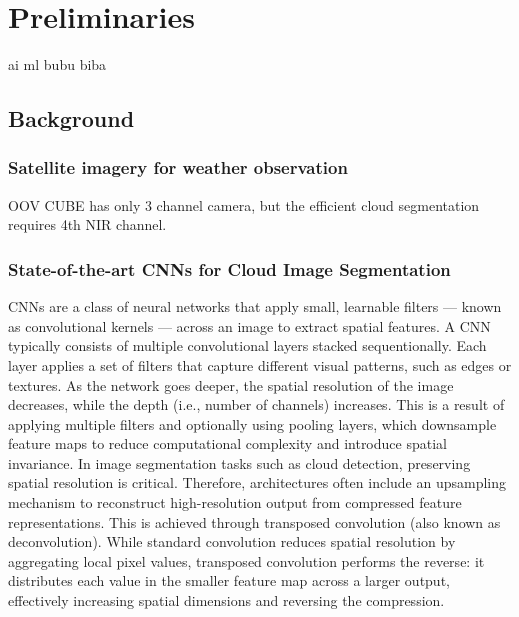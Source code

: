 {

\setlength{\parindent}{0pt}
\setlength{\parskip}{1em}

\section{Preliminaries}
\gls{ai}
\gls{ml}
\gls{bubu}
\gls{biba}
\subsection{Background}
\subsubsection{Satellite imagery for weather observation}
OOV CUBE has only 3 channel camera, but the efficient cloud segmentation requires 4th NIR channel. 
\subsubsection{State-of-the-art CNNs for Cloud Image Segmentation}

CNNs are a class of neural networks that apply small, learnable filters --- known as convolutional kernels --- across an image to extract spatial features. A CNN typically consists of multiple convolutional layers stacked sequentionally. Each layer applies a set of filters that capture different visual patterns, such as edges or textures. As the network goes deeper, the spatial resolution of the image decreases, while the depth (i.e., number of channels) increases. This is a result of applying multiple filters and optionally using pooling layers, which downsample feature maps to reduce computational complexity and introduce spatial invariance.
In image segmentation tasks such as cloud detection, preserving spatial resolution is critical. Therefore, architectures often include an upsampling mechanism to reconstruct high-resolution output from compressed feature representations. This is achieved through transposed convolution (also known as deconvolution). While standard convolution reduces spatial resolution by aggregating local pixel values, transposed convolution performs the reverse: it distributes each value in the smaller feature map across a larger output, effectively increasing spatial dimensions and reversing the compression.

}
